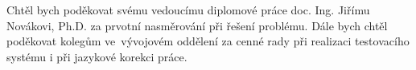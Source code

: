 \startAcknowledgement
Chtěl bych poděkovat svému vedoucímu diplomové práce doc. Ing. Jiřímu Novákovi, Ph.D. za prvotní nasměrování při řešení problému. Dále bych chtěl poděkovat kolegům ve~vývojovém oddělení za cenné rady při realizaci testovacího systému i při jazykové korekci práce.
\stopAcknowledgement

\endinput
